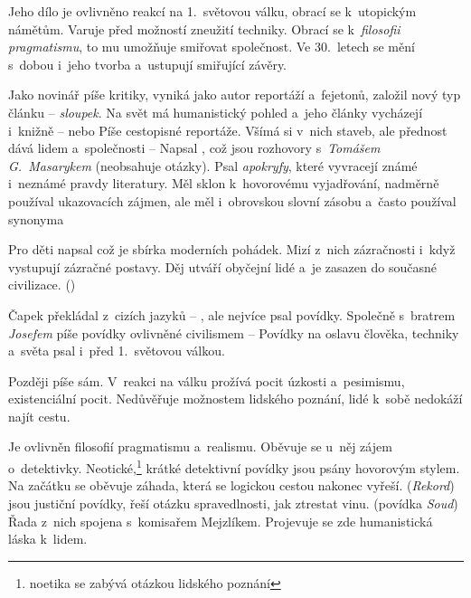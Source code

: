 Jeho dílo je ovlivněno reakcí na 1.~světovou válku, obrací se
k~utopickým námětům. Varuje před možností zneužití techniky. Obrací se
k~\emph{filosofii pragmatismu}, to mu umožňuje smiřovat společnost. Ve
30.~letech se mění s~dobou i~jeho tvorba a~ustupují smiřující závěry. 

Jako novinář píše kritiky, vyniká jako autor reportáží a~fejetonů,
založil nový typ článku -- \emph{sloupek}. Na svět má humanistický
pohled a~jeho články vycházejí i~knižně -- 
 nebo  Píše cestopisné
reportáže. Všímá si v~nich staveb, ale přednost dává lidem a~společnosti
--   
  Napsal , 
což jsou rozhovory s~\emph{Tomášem G.~Masarykem} (neobsahuje otázky). 
Psal \emph{apokryfy}, které vyvracejí známé i~neznámé pravdy literatury.
Měl sklon k~hovorovému vyjadřování, nadměrně používal ukazovacích
zájmen, ale měl i~obrovskou slovní zásobu a~často používal synonyma

Pro děti napsal  což je sbírka moderních
pohádek. Mizí z~nich zázračnosti i~když vystupují zázračné postavy. Děj
utváří obyčejní lidé a~je zasazen do současné civilizace.
()

Čapek překládal z~cizích jazyků -- ,
ale nejvíce psal povídky. Společně s~bratrem \emph{Josefem} píše povídky
ovlivněné civilismem --  
Povídky na oslavu člověka, techniky a~světa psal i~před 1.~světovou válkou.

Později píše sám. V~reakci na válku prožívá pocit úzkosti a~pesimismu,
existenciální pocit. Nedůvěřuje možnostem lidského poznání, lidé k~sobě
nedokáží najít cestu.

Je ovlivněn filosofií pragmatismu a~realismu. Oběvuje se u~něj zájem
o~detektivky. Neotické,\footnote{noetika se zabývá otázkou lidského
poznání} krátké detektivní povídky  jsou
psány hovorovým stylem. Na začátku se oběvuje záhada, která se logickou
cestou nakonec vyřeší. (\emph{Rekord})  jsou
justiční povídky, řeší otázku spravedlnosti, jak ztrestat vinu. (povídka
\emph{Soud}) Řada z~nich spojena s~komisařem Mejzlíkem. Projevuje se zde
humanistická láska k~lidem.

